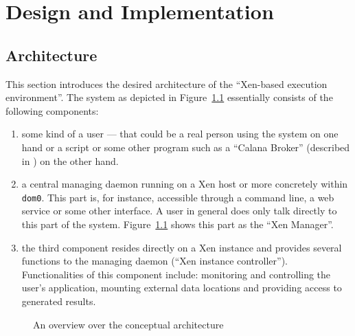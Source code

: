 
\chapter{Design and Implementation}
\label{cha:design}


\section{Architecture}
\label{sec:architecture}

This  section  introduces  the  desired architecture  of  the  ``Xen-based
execution     environment''.      The     system    as     depicted     in
Figure~\ref{fig:architecture}   essentially   consists   of  the   following
components:
\begin{enumerate}
  
\item some kind of a user --- that could be a real person using the system
  on  one hand  or  a script  or some  other  program such  as a  ``Calana
  Broker''        (described        in        \cite{dalheimer05agentbased,
    dalheimer06calanaprotocol}) on the other hand.
  
\item a central  managing daemon running on a Xen  \cite{xen} host or more
  concretely within \texttt{dom0}.  This part is, for instance, accessible
  through a command line, a web service or some other interface. A user in
  general  does  only   talk  directly  to  this  part   of  the  system.  
  Figure~\ref{fig:architecture} shows this part  as the ``Xen Manager''.
  
\item the third component resides  directly on a Xen instance and provides
  several functions to the  managing daemon (``Xen instance controller''). 
  Functionalities  of this component  include: monitoring  and controlling
  the user's  application, mounting external data  locations and providing
  access to generated results.

\end{enumerate}

\begin{figure}[htbp]
  \begin{center}
  \end{center}
  \caption[Architecture overview]{An overview over the conceptual
    architecture}
  \label{fig:architecture}
\end{figure}


